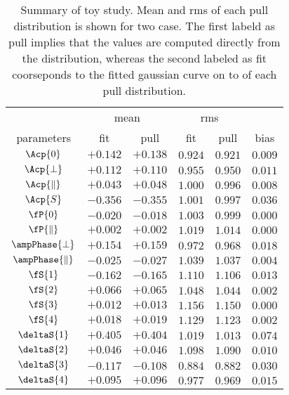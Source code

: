 \begin{table}
  \centering
  \begin{tabular}{c c c c c | c}
    \cline{2-5}
               & \multicolumn{2}{c}{mean} & \multicolumn{2}{c}{rms} &  \\
    \cline{2-6}
    parameters & fit & pull & fit & pull & bias \\
    \cline{1-6}
    $                  \Acp{0}$ & $+0.142$ & $+0.138$ & $0.924$ & $0.921$  & $0.009$ \\    
    $              \Acp{\perp}$ & $+0.112$ & $+0.110$ & $0.955$ & $0.950$  & $0.011$ \\
    $          \Acp{\parallel}$ & $+0.043$ & $+0.048$ & $1.000$ & $0.996$  & $0.008$ \\
    $                  \Acp{S}$ & $-0.356$ & $-0.355$ & $1.001$ & $0.997$  & $0.036$ \\
    \hline                                                                             
    $                   \fP{0}$ & $-0.020$ & $-0.018$ & $1.003$ & $0.999$  & $0.000$ \\
    $           \fP{\parallel}$ & $+0.002$ & $+0.002$ & $1.019$ & $1.014$  & $0.000$ \\
    $         \ampPhase{\perp}$ & $+0.154$ & $+0.159$ & $0.972$ & $0.968$  & $0.018$ \\
    $     \ampPhase{\parallel}$ & $-0.025$ & $-0.027$ & $1.039$ & $1.037$  & $0.004$ \\
    \hline                                                                             
    $                   \fS{1}$ & $-0.162$ & $-0.165$ & $1.110$ & $1.106$  & $0.013$ \\  
    $                   \fS{2}$ & $+0.066$ & $+0.065$ & $1.048$ & $1.044$  & $0.002$ \\
    $                   \fS{3}$ & $+0.012$ & $+0.013$ & $1.156$ & $1.150$  & $0.000$ \\
    $                   \fS{4}$ & $+0.018$ & $+0.019$ & $1.129$ & $1.123$  & $0.002$ \\
    $               \deltaS{1}$ & $+0.405$ & $+0.404$ & $1.019$ & $1.013$  & $0.074$ \\
    $               \deltaS{2}$ & $+0.046$ & $+0.046$ & $1.098$ & $1.090$  & $0.010$ \\   
    $               \deltaS{3}$ & $-0.117$ & $-0.108$ & $0.884$ & $0.882$  & $0.030$ \\
    $               \deltaS{4}$ & $+0.095$ & $+0.096$ & $0.977$ & $0.969$  & $0.015$ \\   
    \hline
  \end{tabular}
  \caption{Summary of toy study. Mean and rms of each pull distribution is shown for two case.
           The first labeld as pull implies that the values are computed directly from the distribution,
           whereas the second labeled as fit coorseponds to the fitted gaussian curve on to of each pull distribution.}
  \label{pull_table}
\end{table}
























